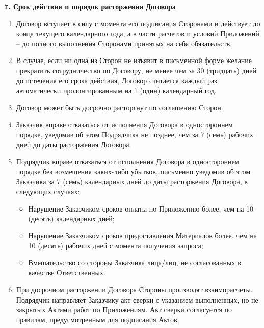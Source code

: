 \documentclass[a4paper, fontsize=12bp]{article}
\newcounter{enum}
\begin{document}
\begin{center}
\textbf{7. Срок действия и порядок расторжения Договора}
\end{center}
\begin{enumerate}[label=\arabic{enum}.\arabic*.]
\item Договор вступает в силу с момента его подписания Сторонами и действует до конца текущего календарного года, а в части расчетов и условий Приложений – до полного выполнения Сторонами принятых на себя обязательств.

\item В случае, если ни одна из Сторон не изъявит в письменной форме желание прекратить сотрудничество по Договору, не менее чем за 30 (тридцать) дней до истечения его срока действия, Договор считается каждый раз автоматически пролонгированным на 1 (один) календарный год.

\item Договор может быть досрочно расторгнут по соглашению Сторон.

\item Заказчик вправе отказаться от исполнения Договора в одностороннем порядке, уведомив об этом Подрядчика не позднее, чем за 7 (семь) рабочих дней до даты расторжения Договора.

\item Подрядчик вправе отказаться от исполнения Договора в одностороннем порядке без возмещения каких-либо убытков, письменно уведомив об этом Заказчика за 7 (семь) календарных дней до даты расторжения Договора, в следующих случаях:
\begin{itemize}
	\item Нарушение Заказчиком сроков оплаты по Приложению более, чем на 10 (десять) календарных дней;

	\item Нарушение Заказчиком сроков предоставления Материалов более, чем на 10 (десять) рабочих дней с момента получения запроса;

	\item Вмешательство со стороны Заказчика лица/лиц, не согласованных в качестве Ответственных.
\end{itemize}

\item При досрочном расторжении Договора Стороны производят взаиморасчеты. Подрядчик направляет Заказчику акт сверки с указанием выполненных, но не закрытых Актами работ по Приложениям. Акт сверки согласуется по правилам, предусмотренным для подписания Актов.
\end{enumerate}
\end{document}
